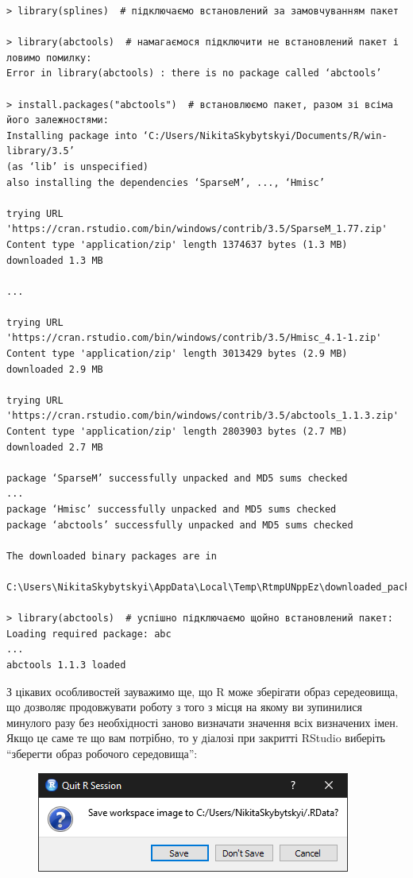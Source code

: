 \documentclass[a4paper, 12pt]{article}
\begin{document}
\begin{verbatim}
> library(splines)  # підключаємо встановлений за замовчуванням пакет

> library(abctools)  # намагаємося підключити не встановлений пакет і ловимо помилку:
Error in library(abctools) : there is no package called ‘abctools’

> install.packages("abctools")  # встановлюємо пакет, разом зі всіма його залежностями:
Installing package into ‘C:/Users/NikitaSkybytskyi/Documents/R/win-library/3.5’
(as ‘lib’ is unspecified)
also installing the dependencies ‘SparseM’, ..., ‘Hmisc’

trying URL 'https://cran.rstudio.com/bin/windows/contrib/3.5/SparseM_1.77.zip'
Content type 'application/zip' length 1374637 bytes (1.3 MB)
downloaded 1.3 MB

...

trying URL 'https://cran.rstudio.com/bin/windows/contrib/3.5/Hmisc_4.1-1.zip'
Content type 'application/zip' length 3013429 bytes (2.9 MB)
downloaded 2.9 MB

trying URL 'https://cran.rstudio.com/bin/windows/contrib/3.5/abctools_1.1.3.zip'
Content type 'application/zip' length 2803903 bytes (2.7 MB)
downloaded 2.7 MB

package ‘SparseM’ successfully unpacked and MD5 sums checked
...
package ‘Hmisc’ successfully unpacked and MD5 sums checked
package ‘abctools’ successfully unpacked and MD5 sums checked

The downloaded binary packages are in
	C:\Users\NikitaSkybytskyi\AppData\Local\Temp\RtmpUNppEz\downloaded_packages

> library(abctools)  # успішно підключаємо щойно встановлений пакет:
Loading required package: abc
...
abctools 1.1.3 loaded
\end{verbatim}

З цікавих особливостей зауважимо ще, що R може зберігати образ середеовища, що дозволяє продовжувати роботу з того з місця на якому ви зупинилися минулого разу без необхідності заново визначати значення всіх визначених імен. Якщо це саме те що вам потрібно, то у діалозі при закритті RStudio виберіть ``зберегти образ робочого середовища'':
\begin{figure}[H]
	\centering
	\includegraphics[width=.5\linewidth]{quit-r-session.png}
\end{figure}
\end{document}
